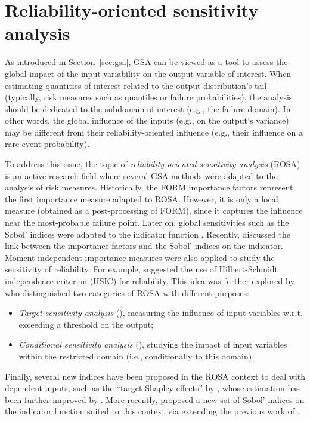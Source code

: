 \section{Reliability-oriented sensitivity analysis}\label{sec:bancs_rosa}


As introduced in Section~\ref{sec:gsa}, GSA can be viewed as a tool to assess the global impact of the input variability on the output variable of interest. 
When estimating quantities of interest related to the output distribution's tail (typically, risk measures such as quantiles or failure probabilities), the analysis should be dedicated to the subdomain of interest (e.g., the failure domain). 
In other words, the global influence of the inputs (e.g., on the output's variance) may be different from their reliability-oriented influence (e.g., their influence on a rare event probability). 

To address this issue, the topic of \textit{reliability-oriented sensitivity analysis} (ROSA) is an active research field where several GSA methods were adapted to the analysis of risk measures. 
Historically, the FORM importance factors represent the first importance measure adapted to ROSA. 
However, it is only a local measure (obtained as a post-processing of FORM), since it captures the influence near the most-probable failure point.  
Later on, global sensitivities such as the Sobol' indices were adapted to the indicator function \citep{wei_2012_rosa,chabridon_2018_thesis,perrin_2019_rosa}. 
Recently, \citet{papaioannou_2021_rosa_form} discussed the link between the importance factors and the Sobol' indices on the indicator. 
Moment-independent importance measures were also applied to study the sensitivity of reliability. 
For example, \citet{daveiga_2015} suggested the use of Hilbert-Schmidt independence criterion (HSIC) for reliability. 
This idea was further explored by \citet{marrel_chabridon_2021} who distinguished two categories of ROSA with different purposes: 
\begin{itemize}
    \item \textit{Target sensitivity analysis} (), measuring the influence of input variables w.r.t. exceeding a threshold on the output; 
    \item \textit{Conditional sensitivity analysis} (), studying the impact of input variables within the restricted domain (i.e., conditionally to this domain).
\end{itemize}
Finally, several new indices have been proposed in the ROSA context to deal with dependent inputs, such as the ``target Shapley effects'' by \citet{ilidrissi_2021_rosa}, whose estimation has been further improved by \citet{demange_2023_ijuq}. 
More recently, \citet{ehre_2024_vb_rosa} proposed a new set of Sobol' indices on the indicator function suited to this context via extending the previous work of \citet{mara_tarantola_2012}.

